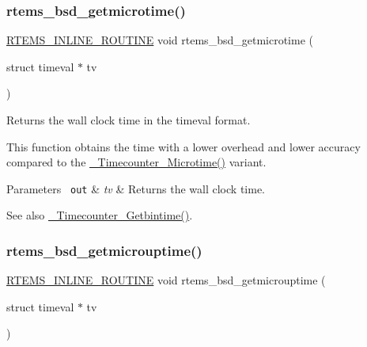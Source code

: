 \subsubsection{\texorpdfstring{rtems\_bsd\_getmicrotime()}{rtems\_bsd\_getmicrotime()}}
{\footnotesize\ttfamily \mbox{\hyperlink{group__RTEMSScoreBaseDefs_gac216239df231d5dbd15e3520b0b9313f}{R\+T\+E\+M\+S\+\_\+\+I\+N\+L\+I\+N\+E\+\_\+\+R\+O\+U\+T\+I\+NE}} void rtems\+\_\+bsd\+\_\+getmicrotime (\begin{DoxyParamCaption}\item[{struct timeval $\ast$}]{tv }\end{DoxyParamCaption})}



Returns the wall clock time in the timeval format. 

This function obtains the time with a lower overhead and lower accuracy compared to the \mbox{\hyperlink{group__RTEMSScoreTimecounter_ga186755758b9fbe63a174ddf24eec5986}{\+\_\+\+Timecounter\+\_\+\+Microtime()}} variant.


\begin{DoxyParams}[1]{Parameters}
\mbox{\texttt{ out}}  & {\em tv} & Returns the wall clock time.\\
\hline
\end{DoxyParams}
\begin{DoxySeeAlso}{See also}
\mbox{\hyperlink{group__RTEMSScoreTimecounter_gaad315babe0faa38d8e287b6354e7e1f7}{\+\_\+\+Timecounter\+\_\+\+Getbintime()}}. 
\end{DoxySeeAlso}
\mbox{\label{group__RTEMSAPIBSD_gada6a5ad1b2e7ba292b58a83e7029bf77}} 
\subsubsection{\texorpdfstring{rtems\_bsd\_getmicrouptime()}{rtems\_bsd\_getmicrouptime()}}
{\footnotesize\ttfamily \mbox{\hyperlink{group__RTEMSScoreBaseDefs_gac216239df231d5dbd15e3520b0b9313f}{R\+T\+E\+M\+S\+\_\+\+I\+N\+L\+I\+N\+E\+\_\+\+R\+O\+U\+T\+I\+NE}} void rtems\+\_\+bsd\+\_\+getmicrouptime (\begin{DoxyParamCaption}\item[{struct timeval $\ast$}]{tv }\end{DoxyParamCaption})}




